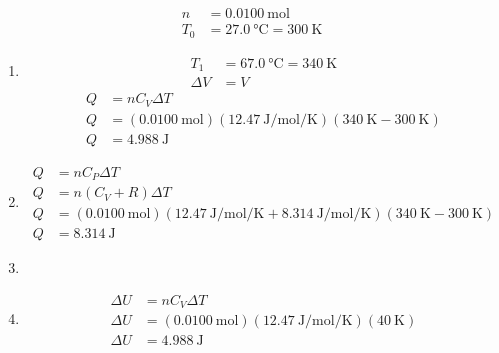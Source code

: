 \documentclass{article}
\begin{document}
\begin{align*}
	n & = \SI{0.0100}{\mole} \\
	T_0 & = \SI{27.0}{\celsius} = \SI{300}{\kelvin}
\end{align*}
\begin{enumerate}[label = \textbf{(\alph*)}]
	\item
		\begin{align*}
			T_1 & = \SI{67.0}{\celsius} = \SI{340}{\kelvin} \\
			\Delta V & = V
		\end{align*}
		\begin{align*}
			Q & = nC_V\Delta T \\
			Q & = (\SI{0.0100}{\mole})(\SI{12.47}{\joule \per \mole \per \kelvin})(\SI{340}{\kelvin} - \SI{300}{\kelvin}) \\
			Q & = \SI{4.988}{\joule}
		\end{align*}
	\item
		\begin{align*}
			Q & = nC_P\Delta T \\
			Q & = n(C_V + R)\Delta T \\
			Q & = (\SI{0.0100}{\mole})(\SI{12.47}{\joule \per \mole \per \kelvin} + \SI{8.314}{\joule \per \mole \per \kelvin})(\SI{340}{\kelvin} - \SI{300}{\kelvin}) \\
			Q & = \SI{8.314}{\joule}
		\end{align*}
	\item
	\item
		\begin{align*}
			\Delta U & = nC_V\Delta T \\
			\Delta U & = (\SI{0.0100}{\mole})(\SI{12.47}{\joule \per \mole \per \kelvin})(\SI{40}{\kelvin}) \\
			\Delta U & = \SI{4.988}{\joule}
		\end{align*}
\end{enumerate}
\end{document}
